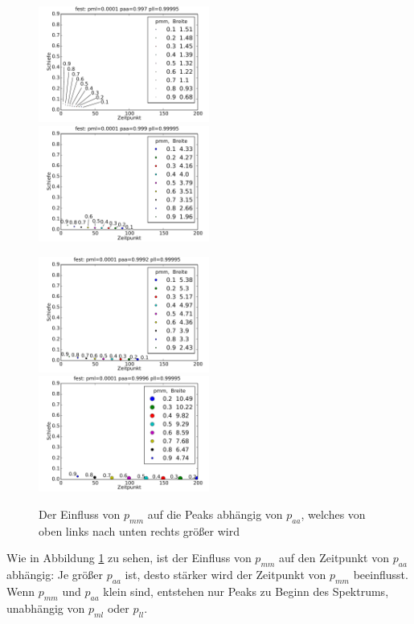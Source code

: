 \begin{figure}[h]
\includegraphics[width=0.5\textwidth]{bilder/pmm/3fest_p_00001_0997_099995}
\includegraphics[width=0.5\textwidth]{bilder/pmm/3fest_p_00001_0999_099995}

\includegraphics[width=0.5\textwidth]{bilder/pmm/3fest_p_00001_09992_099995}
\includegraphics[width=0.5\textwidth]{bilder/pmm/3fest_p_00001_09996_099995}
\caption{Der Einfluss von $p_{mm}$ auf die Peaks abhängig von $p_{aa}$, welches von oben links nach unten rechts größer wird}
\label{einfluss_pmm_1}
\end{figure}

Wie in Abbildung \ref{einfluss_pmm_1} zu sehen, ist der Einfluss von $p_{mm}$ auf den Zeitpunkt von $p_{aa}$ abhängig: Je größer $p_{aa}$ ist, desto stärker wird der Zeitpunkt von $p_{mm}$ beeinflusst. Wenn $p_{mm}$ und $p_{aa}$ klein sind, entstehen nur Peaks zu Beginn des Spektrums, unabhängig von $p_{ml}$ oder $p_{ll}$.

